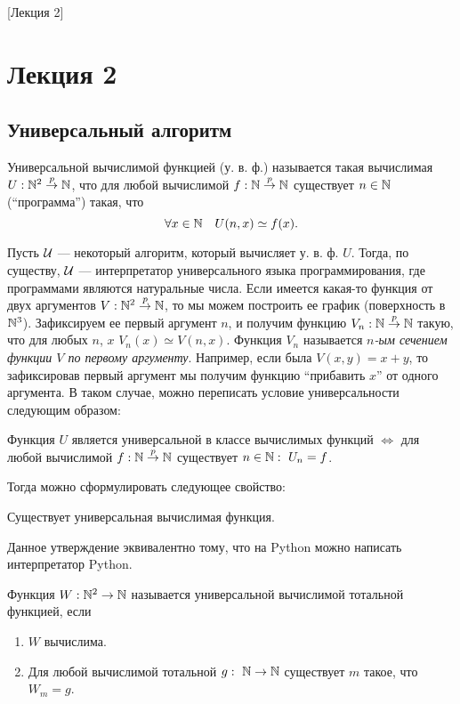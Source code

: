 [Лекция 2]

\section{Лекция 2}

\subsection{Универсальный алгоритм}

\begin{definition}
    Универсальной вычислимой функцией (у. в. ф.) называется такая вычислимая $U: \mathbb{N}^{2} \overset{p}{\to} \mathbb{N}$, что для любой вычислимой $f: \mathbb{N} \overset{p}{\to} \mathbb{N}$ существует $n \in \mathbb{N}$ (\enquote{программа}) такая, что
    $$
        \forall x \in \mathbb{N} \quad U(n, x) \simeq f(x).
    $$
\end{definition}
Пусть $\mathcal{U}$ --- некоторый алгоритм, который вычисляет у. в. ф. $U$.
Тогда, по существу, $\mathcal{U}$ --- интерпретатор универсального языка программирования, где программами являются натуральные числа.
Если имеется какая-то функция от двух аргументов $V: \mathbb{N}^{2} \overset{p}{\to} \mathbb{N}$, то мы можем построить ее график (поверхность в $\mathbb{N}^{3}$).
Зафиксируем ее первый аргумент $n$, и получим функцию $V_{n}: \mathbb{N} \overset{p}{\to} \mathbb{N}$ такую, что для любых $n$, $x$ $V_{n}\left(x\right) \simeq V\left(n, x\right)$.
Функция $V_{n}$ называется {\it $n$-ым сечением функции $V$ по первому аргументу}.
Например, если была $V(x, y) = x + y$, то зафиксировав первый аргумент мы получим функцию \enquote{прибавить $x$} от одного аргумента.
В таком случае, можно переписать условие универсальности следующим образом:
\begin{statement}
    Функция $U$ является универсальной в классе вычислимых функций $\iff$ для любой вычислимой $f: \mathbb{N} \overset{p}{\to} \mathbb{N}$ существует $n \in \mathbb{N}:~U_{n} = f$.
\end{statement}
Тогда можно сформулировать следующее свойство:
\begin{property}[алгоритмов]
    Существует универсальная вычислимая функция.
\end{property}
Данное утверждение эквивалентно тому, что на Python можно написать интерпретатор Python.
\begin{definition}
    Функция $W: \mathbb{N}^{2} \to \mathbb{N}$ называется универсальной вычислимой тотальной функцией, если
    \begin{enumerate}
        \item $W$ вычислима.
        \item Для любой вычислимой тотальной $g:~\mathbb{N} \to \mathbb{N}$ существует $m$ такое, что $W_{m} = g$.
    \end{enumerate}
\end{definition}
